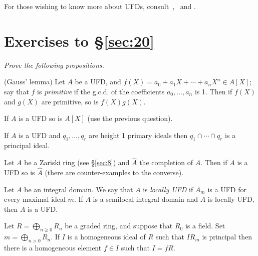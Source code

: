 For those wishing to know more about UFDs, consult~\cite{K},~\cite{S2} and
\cite{F}.

\section*{Exercises to \S\ref{sec:20}}
\emph{Prove the following propositions.}

\begin{exercise}\label{ex:20.1-ex}
(Gauss' lemma) Let $A$ be a UFD, and $f(X) = a_0 + a_1X + \cdots + a_nX^n \in
A[X]$; say that $f$ is \emph{primitive} if the g.c.d. of the coefficients $a_0, \ldots, a_n$
is 1. Then if $f(X)$ and $g(X)$ are primitive, so is $f(X)g(X)$.
\end{exercise}

\begin{exercise}\label{ex:20.2-ex}
If $A$ is a UFD so is $A[X]$ (use the previous question).
\end{exercise}

\begin{exercise}\label{ex:20.3-ex}
If $A$ is a UFD and $q_1, \ldots, q_r$ are height 1 primary ideals then $q_1 \cap \cdots \cap q_r$ is a
principal ideal.
\end{exercise}

\begin{exercise}\label{ex:20.4-ex}
Let $A$ be a Zariski ring (see \S\ref{sec:8}) and $\hat{A}$ the completion of $A$. Then if $A$ is
a UFD so is $\hat{A}$ (there are counter-examples to the converse).
\end{exercise}

\begin{exercise}\label{ex:20.5-ex}
Let $A$ be an integral domain. We say that $A$ is \emph{locally UFD} if $A_m$ is a UFD
for every maximal ideal $m$. If $A$ is a semilocal integral domain and $A$ is
locally UFD, then $A$ is a UFD.
\end{exercise}

\begin{exercise}\label{ex:20.6-ex}
Let $R = \bigoplus_{n \ge 0} R_n$ be a graded ring, and suppose that $R_0$ is a field. Set
$m = \bigoplus_{n > 0} R_n$. If $I$ is a homogeneous ideal of $R$ such that $IR_m$ is principal
then there is a homogeneous element $f \in I$ such that $I = fR$.
\end{exercise}
